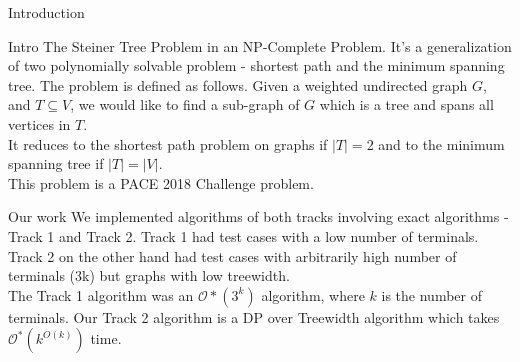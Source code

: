 \begin{section}{Introduction}
	\begin{subsection}{Intro}
	The Steiner Tree Problem in an NP-Complete Problem. It's a generalization of two polynomially solvable problem - shortest path and the minimum spanning tree. The problem is defined as follows. Given a weighted undirected graph $G$, and $T \subseteq V$, we would like to find a sub-graph of $G$ which is a tree and spans all vertices in $T$. \\
	
	It reduces to the shortest path problem on graphs if $|T|=2$ and to the minimum spanning tree if $|T|=|V|$. \\
	
	This problem is a PACE 2018 Challenge problem. 
	\end{subsection}

	\begin{subsection}{Our work}
		We implemented algorithms of both tracks involving exact algorithms - Track 1 and Track 2. Track 1 had test cases with a low number of terminals. Track 2 on the other hand had test cases with arbitrarily high number of terminals (3k) but graphs with low treewidth. \\
		
		The Track 1 algorithm was an $\mathcal{O}*(3^k)$ algorithm, where $k$ is the number of terminals. Our Track 2 algorithm is a DP over Treewidth algorithm which takes $\mathcal{O}^*(k^{O(k)})$ time. 
	\end{subsection}
\end{section}